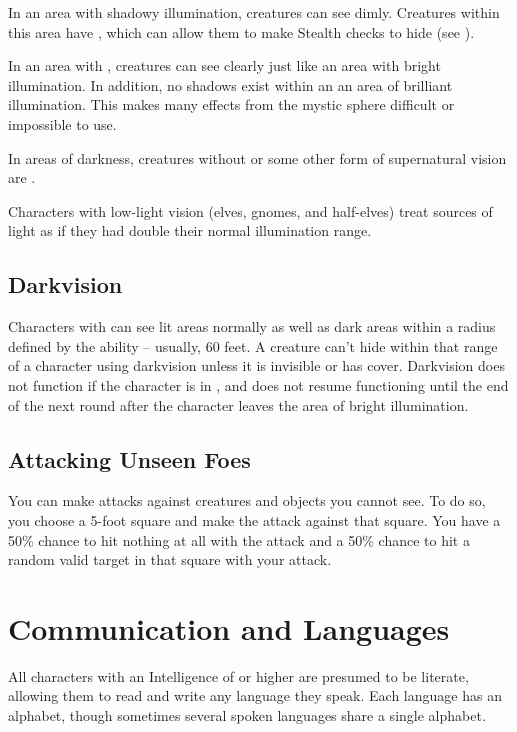    In an area with shadowy illumination, creatures can see dimly.
    Creatures within this area have , which can allow them to make Stealth checks to hide (see ).

    In an area with , creatures can see clearly just like an area with bright illumination.
    In addition, no shadows exist within an an area of brilliant illumination.
    This makes many effects from the  mystic sphere difficult or impossible to use.

    In areas of darkness, creatures without  or some other form of supernatural vision are \blinded.

    Characters with low-light vision (elves, gnomes, and half-elves) treat sources of light as if they had double their normal illumination range.

    \subsection{Darkvision}\label{Darkvision}
        Characters with  can see lit areas normally as well as dark areas within a radius defined by the ability -- usually, 60 feet.
        A creature can't hide within that range of a character using darkvision unless it is invisible or has cover.
        Darkvision does not function if the character is in , and does not resume functioning until the end of the next round after the character leaves the area of bright illumination.

    \subsection{Attacking Unseen Foes}
        You can make attacks against creatures and objects you cannot see.
        To do so, you choose a 5-foot square and make the attack against that square.
        You have a 50\% chance to hit nothing at all with the attack and a 50\% chance to hit a random valid target in that square with your attack.

\section{Communication and Languages}\label{Languages}\label{Communication and Languages}

    All characters with an Intelligence of  or higher are presumed to be literate, allowing them to read and write any language they speak. Each language has an alphabet, though sometimes several spoken languages share a single alphabet.

